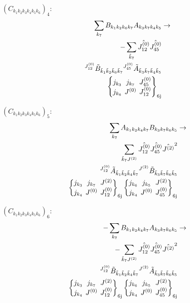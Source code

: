 \documentclass[11pt]{article}
\newcommand{\sixj}[6]{\begingroup\setlength{\arraycolsep}{0.2em}\begin{Bmatrix} #1 & #2 & #3 \\ #4 & #5 & #6 \end{Bmatrix}_{\text{6j}}\endgroup}
\begin{document}
$\left({C}_{{k}_{1}{k}_{2}{k}_{3}{k}_{4}{k}_{5}{k}_{6}}\right)_{4}$:
\begin{align}
\sum_{{k}_{7}}{B}_{{k}_{1}{k}_{2}{k}_{6}{k}_{7}}{A}_{{k}_{3}{k}_{7}{k}_{4}{k}_{5}}&\rightarrow \notag \\-\sum_{\tilde{k}_{7}}\hat{J^{(0)}_{12}}\hat{J^{(0)}_{45}}& \notag \\{}^{J^{(0)}_{12}}\tilde{B}_{\tilde{k}_{1}\tilde{k}_{2}\tilde{k}_{6}\tilde{k}_{7}}{}^{J^{(0)}_{45}}\tilde{A}_{\tilde{k}_{3}\tilde{k}_{7}\tilde{k}_{4}\tilde{k}_{5}}& \notag \\\sixj{j_{{k}_{3}}}{j_{{k}_{7}}}{J^{(0)}_{45}}{j_{{k}_{6}}}{J^{(0)}}{J^{(0)}_{12}}
\end{align}

$\left({C}_{{k}_{1}{k}_{2}{k}_{3}{k}_{4}{k}_{5}{k}_{6}}\right)_{5}$:
\begin{align}
\sum_{{k}_{7}}{A}_{{k}_{1}{k}_{2}{k}_{4}{k}_{7}}{B}_{{k}_{3}{k}_{7}{k}_{6}{k}_{5}}&\rightarrow \notag \\\sum_{\tilde{k}_{7}J^{(2)}}\hat{J^{(0)}_{12}}\hat{J^{(0)}_{45}}\hat{J^{(2)}}^{2}& \notag \\{}^{J^{(0)}_{12}}\tilde{A}_{\tilde{k}_{1}\tilde{k}_{2}\tilde{k}_{4}\tilde{k}_{7}}{}^{J^{(2)}}\tilde{B}_{\tilde{k}_{3}\tilde{k}_{7}\tilde{k}_{6}\tilde{k}_{5}}& \notag \\\sixj{j_{{k}_{3}}}{j_{{k}_{7}}}{J^{(2)}}{j_{{k}_{4}}}{J^{(0)}}{J^{(0)}_{12}}\sixj{j_{{k}_{6}}}{j_{{k}_{5}}}{J^{(2)}}{j_{{k}_{4}}}{J^{(0)}}{J^{(0)}_{45}}
\end{align}

$\left({C}_{{k}_{1}{k}_{2}{k}_{3}{k}_{4}{k}_{5}{k}_{6}}\right)_{6}$:
\begin{align}
-\sum_{{k}_{7}}{B}_{{k}_{1}{k}_{2}{k}_{4}{k}_{7}}{A}_{{k}_{3}{k}_{7}{k}_{6}{k}_{5}}&\rightarrow \notag \\-\sum_{\tilde{k}_{7}J^{(2)}}\hat{J^{(0)}_{12}}\hat{J^{(0)}_{45}}\hat{J^{(2)}}^{2}& \notag \\{}^{J^{(0)}_{12}}\tilde{B}_{\tilde{k}_{1}\tilde{k}_{2}\tilde{k}_{4}\tilde{k}_{7}}{}^{J^{(2)}}\tilde{A}_{\tilde{k}_{3}\tilde{k}_{7}\tilde{k}_{6}\tilde{k}_{5}}& \notag \\\sixj{j_{{k}_{3}}}{j_{{k}_{7}}}{J^{(2)}}{j_{{k}_{4}}}{J^{(0)}}{J^{(0)}_{12}}\sixj{j_{{k}_{6}}}{j_{{k}_{5}}}{J^{(2)}}{j_{{k}_{4}}}{J^{(0)}}{J^{(0)}_{45}}
\end{align}
\end{document}
